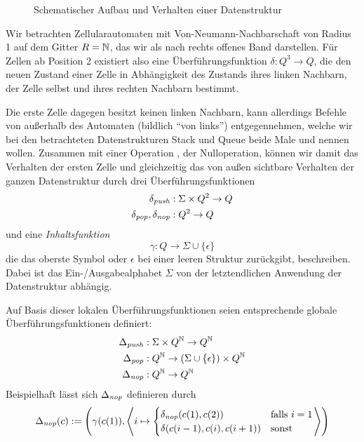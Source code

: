 \documentclass{article}
\begin{document}
\begin{figure}[h]
    \centering
    \caption{Schematischer Aufbau und Verhalten einer Datenstruktur}
\end{figure}
Wir betrachten Zellularautomaten mit Von-Neumann-Nachbarschaft von Radius 1 auf dem Gitter $R = \mathbb{N}$, das wir als nach rechts offenes Band darstellen. Für Zellen ab Position 2 existiert also eine Überführungsfunktion $\delta : Q^3 \rightarrow Q$, die den neuen Zustand einer Zelle in Abhängigkeit des Zustands ihres linken Nachbarn, der Zelle selbst und ihres rechten Nachbarn bestimmt.

Die erste Zelle dagegen besitzt keinen linken Nachbarn, kann allerdings Befehle von außerhalb des Automaten (bildlich "`von links"') entgegennehmen, welche wir bei den betrachteten Datenstrukturen Stack und Queue beide Male \push und \pop nennen wollen. Zusammen mit einer Operation \nop, der Nulloperation, können wir damit das Verhalten der ersten Zelle und gleichzeitig das von außen sichtbare Verhalten der ganzen Datenstruktur durch drei Überführungsfunktionen
\begin{align*}
    \delta_{\mathit{push}} &: \Sigma \times Q^2 \rightarrow Q \\
    \delta_{\mathit{pop}}, \delta_{\mathit{nop}} &: Q^2 \rightarrow Q
\end{align*}
und eine \emph{Inhaltsfunktion}
\[ \gamma : Q \rightarrow \Sigma \cup \{\epsilon\} \]
die das oberste Symbol oder $\epsilon$ bei einer leeren Struktur zurückgibt, beschreiben. Dabei ist das Ein-/Ausgabealphabet $\Sigma$ von der letztendlichen Anwendung der Datenstruktur abhängig.

Auf Basis dieser lokalen Überführungsfunktionen seien entsprechende globale Überführungsfunktionen definiert:
\begin{align*}
    \Delta_{\mathit{push}} &: \Sigma \times Q^{\mathbb{N}} \rightarrow Q^{\mathbb{N}} \\
    \Delta_{\mathit{pop}} &: Q^{\mathbb{N}} \rightarrow (\Sigma \cup \{\epsilon\}) \times Q^{\mathbb{N}} \\
    \Delta_{\mathit{nop}} &: Q^{\mathbb{N}} \rightarrow Q^{\mathbb{N}}
\end{align*}
Beispielhaft lässt sich $\Delta_\mathit{nop}$ definieren durch
\[ \Delta_\mathit{nop}(c) := \left(\gamma(c(1)), \left< i \mapsto \begin{cases}
        \delta_\mathit{nop}(c(1), c(2)) &\text{falls } i = 1 \\
        \delta(c(i-1), c(i), c(i+1)) &\text{sonst }
\end{cases} \right> \right) \]
\end{document}

